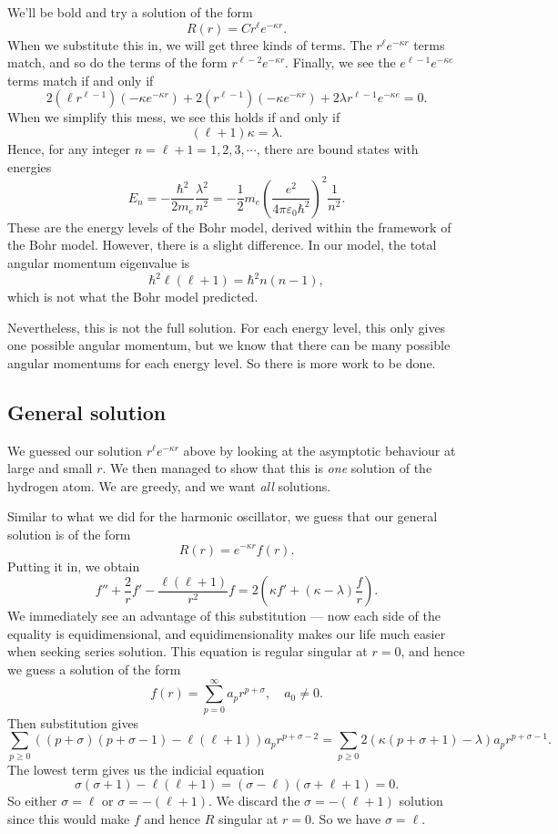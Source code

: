 \documentclass[a4paper]{article}
\begin{document}
We'll be bold and try a solution of the form
\[
  R(r) = C r^\ell e^{-\kappa r}.
\]
When we substitute this in, we will get three kinds of terms. The $r^\ell e^{-\kappa r}$ terms match, and so do the terms of the form $r^{\ell - 2} e^{-\kappa r}$. Finally, we see the $e^{\ell - 1}e^{-\kappa e}$ terms match if and only if
\[
  2(\ell r^{\ell - 1})(- \kappa e^{- \kappa r}) + 2 (r^{\ell - 1})(- \kappa e^{- \kappa r}) + 2\lambda r^{\ell - 1} e^{-\kappa e} = 0.
\]
When we simplify this mess, we see this holds if and only if
\[
  (\ell + 1) \kappa = \lambda.
\]
Hence, for any integer $n = \ell + 1 = 1, 2, 3, \cdots$, there are bound states with energies
\[
  E_n = -\frac{\hbar^2}{2 m_e} \frac{\lambda^2}{n^2} = -\frac{1}{2}m_e \left(\frac{e^2}{4 \pi \varepsilon_0 \hbar^2}\right)^2 \frac{1}{n^2}.
\]
These are the energy levels of the Bohr model, derived within the framework of the Bohr model. However, there is a slight difference. In our model, the total angular momentum eigenvalue is
\[
  \hbar^2 \ell(\ell + 1) = \hbar^2 n(n - 1),
\]
which is not what the Bohr model predicted.

Nevertheless, this is not the full solution. For each energy level, this only gives one possible angular momentum, but we know that there can be many possible angular momentums for each energy level. So there is more work to be done.

\subsection{General solution}
We guessed our solution $r^\ell e^{-\kappa r}$ above by looking at the asymptotic behaviour at large and small $r$. We then managed to show that this is \emph{one} solution of the hydrogen atom. We are greedy, and we want \emph{all} solutions.

Similar to what we did for the harmonic oscillator, we guess that our general solution is of the form
\[
  R(r) = e^{-\kappa r} f(r).
\]
Putting it in, we obtain
\[
  f'' + \frac{2}{r} f' - \frac{\ell(\ell + 1)}{r^2}f = 2\left(\kappa f' + (\kappa - \lambda)\frac{f}{r}\right).
\]
We immediately see an advantage of this substitution --- now each side of the equality is equidimensional, and equidimensionality makes our life much easier when seeking series solution. This equation is regular singular at $r = 0$, and hence we guess a solution of the form
\[
  f(r) = \sum_{p = 0}^\infty a_p r^{p + \sigma},\quad a_0 \not= 0.
\]
Then substitution gives
\[
  \sum_{p \geq 0} ((p + \sigma)(p + \sigma - 1) - \ell(\ell + 1)) a_p r^{p + \sigma - 2} = \sum_{p \geq 0} 2(\kappa(p + \sigma + 1)- \lambda)a_p r^{p + \sigma - 1}.
\]
The lowest term gives us the indicial equation
\[
  \sigma(\sigma + 1) - \ell(\ell + 1) = (\sigma - \ell)(\sigma + \ell + 1) = 0.
\]
So either $\sigma = \ell$ or $\sigma = -(\ell + 1)$. We discard the $\sigma = -(\ell + 1)$ solution since this would make $f$ and hence $R$ singular at $r = 0$. So we have $\sigma = \ell$.
\end{document}
